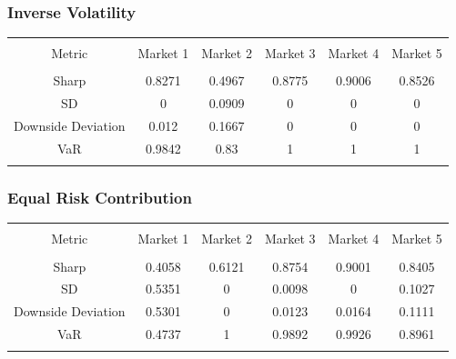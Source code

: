 \documentclass[11pt,preprint, authoryear]{elsarticle}
\let\origtable\table
\let\endorigtable\endtable
\renewenvironment{table}[1][2] {
    \expandafter\origtable\expandafter[H]
} {
    \endorigtable
}
\numberwithin{equation}{section}
\numberwithin{figure}{section}
\numberwithin{table}{section}
\begin{document}
\hypertarget{inverse-volatility}{%
\subsubsection{Inverse Volatility}\label{inverse-volatility}}

\begin{table}[!htbp] \centering 
  \caption{Market 5 Risk Metrics} 
  \label{IV} 
\begin{tabular}{@{\extracolsep{5pt}} cccccc} 
\\[-1.8ex]\hline 
\hline \\[-1.8ex] 
Metric & Market 1 & Market 2 & Market 3 & Market 4 & Market 5 \\ 
\hline \\[-1.8ex] 
Sharp & 0.8271 & 0.4967 & 0.8775 & 0.9006 & 0.8526 \\ 
SD & 0 & 0.0909 & 0 & 0 & 0 \\ 
Downside Deviation & 0.012 & 0.1667 & 0 & 0 & 0 \\ 
VaR & 0.9842 & 0.83 & 1 & 1 & 1 \\ 
\hline \\[-1.8ex] 
\end{tabular} 
\end{table}

\hypertarget{equal-risk-contribution}{%
\subsubsection{Equal Risk Contribution}\label{equal-risk-contribution}}

\begin{table}[!htbp] \centering 
  \caption{Market 5 Risk Metrics} 
  \label{ERC} 
\begin{tabular}{@{\extracolsep{5pt}} cccccc} 
\\[-1.8ex]\hline 
\hline \\[-1.8ex] 
Metric & Market 1 & Market 2 & Market 3 & Market 4 & Market 5 \\ 
\hline \\[-1.8ex] 
Sharp & 0.4058 & 0.6121 & 0.8754 & 0.9001 & 0.8405 \\ 
SD & 0.5351 & 0 & 0.0098 & 0 & 0.1027 \\ 
Downside Deviation & 0.5301 & 0 & 0.0123 & 0.0164 & 0.1111 \\ 
VaR & 0.4737 & 1 & 0.9892 & 0.9926 & 0.8961 \\ 
\hline \\[-1.8ex] 
\end{tabular} 
\end{table}
\end{document}
